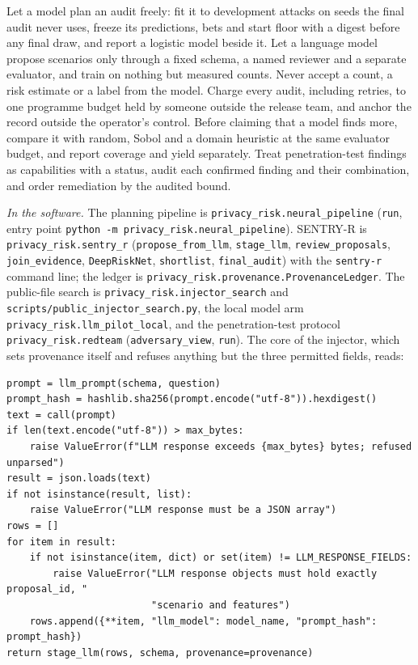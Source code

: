 \begin{inpractice}
Let a model plan an audit freely: fit it to development attacks on seeds the final audit
never uses, freeze its predictions, bets and start floor with a digest before any final
draw, and report a logistic model beside it. Let a language model propose scenarios
only through a fixed schema, a named reviewer and a separate evaluator, and train on
nothing but measured counts. Never accept a count, a risk estimate or a label from the
model. Charge every audit, including retries, to one programme budget held by someone
outside the release team, and anchor the record outside the operator's control. Before
claiming that a model finds more, compare it with random, Sobol and a domain heuristic
at the same evaluator budget, and report coverage and yield separately. Treat
penetration-test findings as capabilities with a status, audit each confirmed finding
and their combination, and order remediation by the audited bound.

\sloppy\smallskip\noindent\textit{In the software.} The planning pipeline is
\texttt{privacy\_risk.neural\_pipeline} (\texttt{run}, entry point
\texttt{python -m privacy\_risk.neural\_pipeline}). SENTRY-R is
\texttt{privacy\_risk.sentry\_r} (\texttt{propose\_from\_llm}, \texttt{stage\_llm},
\texttt{review\_proposals}, \texttt{join\_evidence}, \texttt{DeepRiskNet},
\texttt{shortlist}, \texttt{final\_audit}) with the \texttt{sentry-r} command line; the
ledger is \texttt{privacy\_risk.provenance.ProvenanceLedger}. The public-file search is
\texttt{privacy\_risk.injector\_search} and \texttt{scripts/public\_injector\_search.py},
the local model arm \texttt{privacy\_risk.llm\_pilot\_local}, and the penetration-test
protocol \texttt{privacy\_risk.redteam} (\texttt{adversary\_view}, \texttt{run}). The
core of the injector, which sets provenance itself and refuses anything but the three
permitted fields, reads:
\begin{lstlisting}
prompt = llm_prompt(schema, question)
prompt_hash = hashlib.sha256(prompt.encode("utf-8")).hexdigest()
text = call(prompt)
if len(text.encode("utf-8")) > max_bytes:
    raise ValueError(f"LLM response exceeds {max_bytes} bytes; refused unparsed")
result = json.loads(text)
if not isinstance(result, list):
    raise ValueError("LLM response must be a JSON array")
rows = []
for item in result:
    if not isinstance(item, dict) or set(item) != LLM_RESPONSE_FIELDS:
        raise ValueError("LLM response objects must hold exactly proposal_id, "
                         "scenario and features")
    rows.append({**item, "llm_model": model_name, "prompt_hash": prompt_hash})
return stage_llm(rows, schema, provenance=provenance)
\end{lstlisting}
\end{inpractice}

